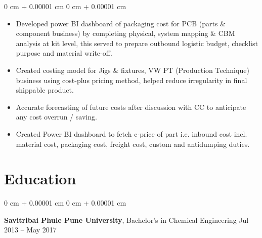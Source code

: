 \documentclass[10pt, letterpaper]{article}
\newenvironment{highlights}{
    \begin{itemize}[
        topsep=0.10 cm,
        parsep=0.10 cm,
        partopsep=0pt,
        itemsep=0pt,
        leftmargin=0 cm + 10pt
    ]
}{
    \end{itemize}
} %
\newenvironment{onecolentry}{
    \begin{adjustwidth}{
        0 cm + 0.00001 cm
    }{
        0 cm + 0.00001 cm
    }
}{
    \end{adjustwidth}
} %
\newenvironment{twocolentry}[2][]{
    \onecolentry
    \def\secondColumn{#2}
    \setcolumnwidth{\fill, 4.5 cm}
    \begin{paracol}{2}
}{
    \switchcolumn \raggedleft \secondColumn
    \end{paracol}
    \endonecolentry
} %
\begin{document}
        \vspace{0.10 cm}
        \begin{onecolentry}
            \begin{highlights}
                \item 
Developed power BI dashboard of packaging cost for PCB (parts \& component business) by completing physical, system mapping \& CBM analysis at kit level, this served to prepare outbound logistic budget, checklist purpose and material write-off.
                \item 
Created costing model for Jigs \& fixtures, VW PT (Production Technique) business using cost-plus pricing method, helped reduce irregularity in final shippable product.
                                \item 
Accurate forecasting of future costs after discussion with CC to anticipate any cost overrun / saving.
                \item 
Created Power BI dashboard to fetch c-price of part i.e. inbound cost incl. material cost, packaging cost, freight cost, custom and antidumping duties.

            \end{highlights}
        \end{onecolentry}



    \section{Education}



        
        \begin{twocolentry}{
            Jul 2013 – May 2017
        }
            \textbf{Savitribai Phule Pune University}, Bachelor's in Chemical Engineering\end{twocolentry}

\end{document}
